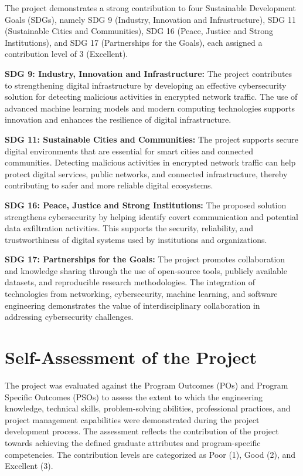 \begin{appendices}
The project demonstrates a strong contribution to four Sustainable Development
Goals (SDGs), namely SDG 9 (Industry, Innovation and Infrastructure),
SDG 11 (Sustainable Cities and Communities), SDG 16 (Peace, Justice and
Strong Institutions), and SDG 17 (Partnerships for the Goals), each
assigned a contribution level of 3 (Excellent).

\textbf{SDG 9: Industry, Innovation and Infrastructure:}
The project contributes to strengthening digital infrastructure by developing
an effective cybersecurity solution for detecting malicious activities in
encrypted network traffic. The use of advanced machine learning models and
modern computing technologies supports innovation and enhances the resilience
of digital infrastructure.

\textbf{SDG 11: Sustainable Cities and Communities:}
The project supports secure digital environments that are essential for smart
cities and connected communities. Detecting malicious activities in encrypted
network traffic can help protect digital services, public networks, and
connected infrastructure, thereby contributing to safer and more reliable
digital ecosystems.

\textbf{SDG 16: Peace, Justice and Strong Institutions:}
The proposed solution strengthens cybersecurity by helping identify covert
communication and potential data exfiltration activities. This supports the
security, reliability, and trustworthiness of digital systems used by
institutions and organizations.

\textbf{SDG 17: Partnerships for the Goals:}
The project promotes collaboration and knowledge sharing through the use of
open-source tools, publicly available datasets, and reproducible research
methodologies. The integration of technologies from networking,
cybersecurity, machine learning, and software engineering demonstrates
the value of interdisciplinary collaboration in addressing cybersecurity
challenges.

\chapter{Self-Assessment of the Project}
The project was evaluated against the Program Outcomes (POs) and
Program Specific Outcomes (PSOs) to assess the extent to which the
engineering knowledge, technical skills, problem-solving abilities,
professional practices, and project management capabilities were
demonstrated during the project development process.
The assessment reflects the contribution of the project towards
achieving the defined graduate attributes and program-specific
competencies. The contribution levels are categorized as Poor (1),
Good (2), and Excellent (3).


\end{appendices}
